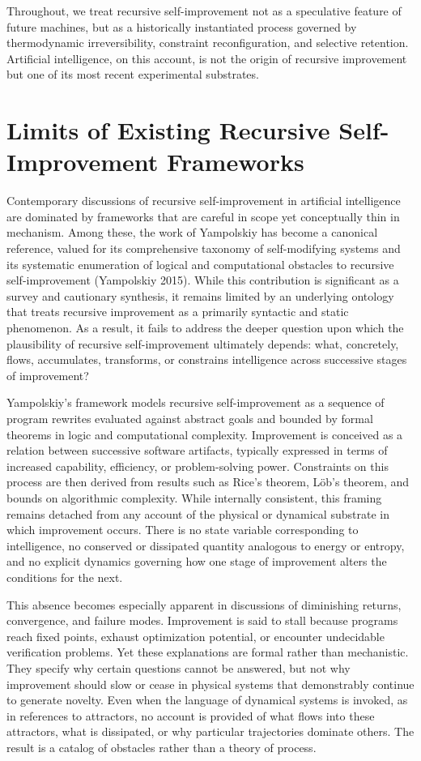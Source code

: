 \documentclass[11pt]{article}
\begin{document}
Throughout, we treat recursive self-improvement not as a speculative feature of future machines, but as a historically instantiated process governed by thermodynamic irreversibility, constraint reconfiguration, and selective retention. Artificial intelligence, on this account, is not the origin of recursive improvement but one of its most recent experimental substrates.

\section{Limits of Existing Recursive Self-Improvement Frameworks}

Contemporary discussions of recursive self-improvement in artificial intelligence are dominated by frameworks that are careful in scope yet conceptually thin in mechanism. Among these, the work of Yampolskiy has become a canonical reference, valued for its comprehensive taxonomy of self-modifying systems and its systematic enumeration of logical and computational obstacles to recursive self-improvement (Yampolskiy 2015). While this contribution is significant as a survey and cautionary synthesis, it remains limited by an underlying ontology that treats recursive improvement as a primarily syntactic and static phenomenon. As a result, it fails to address the deeper question upon which the plausibility of recursive self-improvement ultimately depends: what, concretely, flows, accumulates, transforms, or constrains intelligence across successive stages of improvement?

Yampolskiy’s framework models recursive self-improvement as a sequence of program rewrites evaluated against abstract goals and bounded by formal theorems in logic and computational complexity. Improvement is conceived as a relation between successive software artifacts, typically expressed in terms of increased capability, efficiency, or problem-solving power. Constraints on this process are then derived from results such as Rice’s theorem, Löb’s theorem, and bounds on algorithmic complexity. While internally consistent, this framing remains detached from any account of the physical or dynamical substrate in which improvement occurs. There is no state variable corresponding to intelligence, no conserved or dissipated quantity analogous to energy or entropy, and no explicit dynamics governing how one stage of improvement alters the conditions for the next.

This absence becomes especially apparent in discussions of diminishing returns, convergence, and failure modes. Improvement is said to stall because programs reach fixed points, exhaust optimization potential, or encounter undecidable verification problems. Yet these explanations are formal rather than mechanistic. They specify why certain questions cannot be answered, but not why improvement should slow or cease in physical systems that demonstrably continue to generate novelty. Even when the language of dynamical systems is invoked, as in references to attractors, no account is provided of what flows into these attractors, what is dissipated, or why particular trajectories dominate others. The result is a catalog of obstacles rather than a theory of process.
\end{document}
